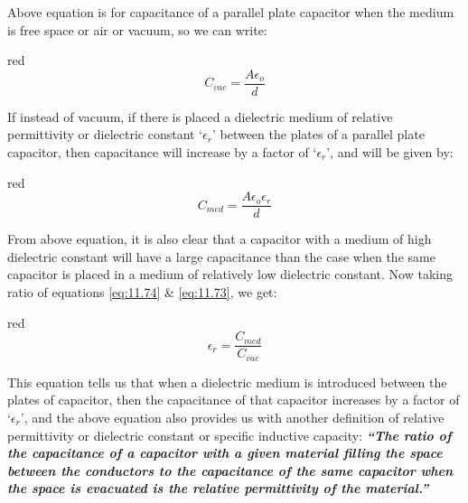 Above equation is for capacitance of a parallel plate capacitor
when the medium is free space or air or vacuum, so we can write:
\begin{mybox}{red}{}
\begin{equation}\label{eq:11.73}
  C_{vac} =  \frac{A\epsilon_{o}}{d}
\end{equation}
\end{mybox}
If instead of vacuum, if there is placed a dielectric medium of relative
permittivity or dielectric constant ‘$\epsilon_{r}$’ between the plates
of a parallel plate capacitor,
then capacitance will increase by a factor of ‘$\epsilon_{r}$’, and will be given by:
\begin{mybox}{red}{}
\begin{equation}\label{eq:11.74}
  C_{med}=  \frac{A\epsilon_{o}\epsilon_{r}}{d}
\end{equation}
\end{mybox}
From above equation,  it is also clear that a capacitor with a medium of high dielectric constant will have a large capacitance than the case when the same capacitor is placed in a medium of relatively low dielectric constant.
Now taking ratio of equations \ref{eq:11.74} \& \ref{eq:11.73}, we get:
\begin{mybox}{red}{}
\begin{equation}
  \epsilon_{r} = \frac{C_{med}}{C_{vac}}
\end{equation}
\end{mybox}
This equation tells us that when a dielectric medium is introduced between
the plates of capacitor, then the capacitance of that capacitor increases
by a factor of ‘$\epsilon_{r}$’, and the above equation also provides us
with another definition of relative permittivity or dielectric constant or
specific inductive capacity:
\textit{\textbf{“The ratio of the capacitance of a capacitor with a given material filling
the space between the conductors to the capacitance of the same capacitor
when the space is evacuated is the relative permittivity of the material.”}}
